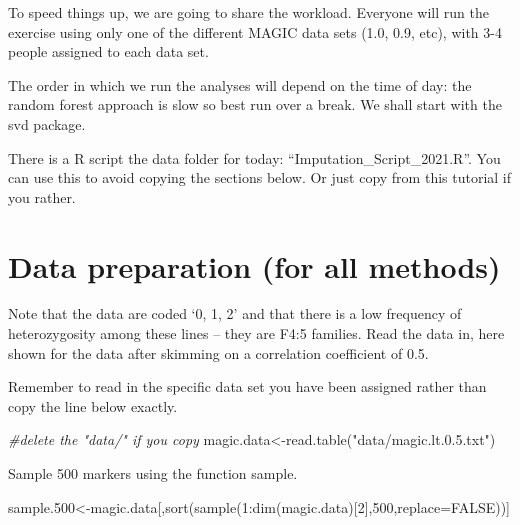 \documentclass[
]{book}
\makeatletter
\newenvironment{Shaded}{\begin{snugshade}}{\end{snugshade}}
\newcommand{\AttributeTok}[1]{\textcolor[rgb]{0.77,0.63,0.00}{#1}}
\newcommand{\CommentTok}[1]{\textcolor[rgb]{0.56,0.35,0.01}{\textit{#1}}}
\newcommand{\ConstantTok}[1]{\textcolor[rgb]{0.00,0.00,0.00}{#1}}
\newcommand{\DecValTok}[1]{\textcolor[rgb]{0.00,0.00,0.81}{#1}}
\newcommand{\FloatTok}[1]{\textcolor[rgb]{0.00,0.00,0.81}{#1}}
\newcommand{\FunctionTok}[1]{\textcolor[rgb]{0.00,0.00,0.00}{#1}}
\newcommand{\NormalTok}[1]{#1}
\newcommand{\OtherTok}[1]{\textcolor[rgb]{0.56,0.35,0.01}{#1}}
\newcommand{\SpecialCharTok}[1]{\textcolor[rgb]{0.00,0.00,0.00}{#1}}
\newcommand{\StringTok}[1]{\textcolor[rgb]{0.31,0.60,0.02}{#1}}
\newenvironment{kframe}{%
\medskip{}
\setlength{\fboxsep}{.8em}
 \def\at@end@of@kframe{}%
 \ifinner\ifhmode%
  \def\at@end@of@kframe{\end{minipage}}%
  \begin{minipage}{\columnwidth}%
 \fi\fi%
 \def\FrameCommand##1{\hskip\@totalleftmargin \hskip-\fboxsep
 \colorbox{shadecolor}{##1}\hskip-\fboxsep
     \hskip-\linewidth \hskip-\@totalleftmargin \hskip\columnwidth}%
 \MakeFramed {\advance\hsize-\width
   \@totalleftmargin\z@ \linewidth\hsize
   \@setminipage}}%
 {\par\unskip\endMakeFramed%
 \at@end@of@kframe}
\newenvironment{rmdblock}[1]
  {
  \begin{itemize}
  \renewcommand{\labelitemi}{
    \raisebox{-.7\height}[0pt][0pt]{
      {\setkeys{Gin}{width=3em,keepaspectratio}\texttt{[image: images/\#1]}}
    }
  }
  \setlength{\fboxsep}{1em}
  \begin{kframe}
  \item
  }
  {
  \end{kframe}
  \end{itemize}
  }
\newenvironment{rmdnote}
  {\begin{rmdblock}{note}}
  {\end{rmdblock}}
\newenvironment{rmdwarning}
  {\begin{rmdblock}{warning}}
  {\end{rmdblock}}
\makeatother
\begin{document}
To speed things up, we are going to share the workload. Everyone will run the exercise using only one of the different MAGIC data sets (1.0, 0.9, etc), with 3-4 people assigned to each data set.

The order in which we run the analyses will depend on the time of day: the random forest approach is slow so best run over a break. We shall start with the svd package.

\begin{rmdnote}
There is a R script the data folder for today: ``Imputation\_Script\_2021.R''. You can use this to avoid copying the sections below. Or just copy from this tutorial if you rather.
\end{rmdnote}

\hypertarget{data-preparation-for-all-methods}{%
\section{Data preparation (for all methods)}\label{data-preparation-for-all-methods}}

Note that the data are coded `0, 1, 2' and that there is a low frequency of heterozygosity among these lines -- they are F4:5 families. Read the data in, here shown for the data after skimming on a correlation coefficient of 0.5.

\begin{rmdwarning}
Remember to read in the specific data set you have been assigned rather than copy the line below exactly.
\end{rmdwarning}

\begin{Shaded}
\begin{Highlighting}[]
\CommentTok{\#delete the "data/" if you copy}
\NormalTok{magic.data}\OtherTok{\textless{}{-}}\FunctionTok{read.table}\NormalTok{(}\StringTok{"data/magic.lt.0.5.txt"}\NormalTok{)}
\end{Highlighting}
\end{Shaded}

Sample 500 markers using the function sample.

\begin{Shaded}
\begin{Highlighting}[]
\NormalTok{sample}\FloatTok{.500}\OtherTok{\textless{}{-}}\NormalTok{magic.data[,}\FunctionTok{sort}\NormalTok{(}\FunctionTok{sample}\NormalTok{(}\DecValTok{1}\SpecialCharTok{:}\FunctionTok{dim}\NormalTok{(magic.data)[}\DecValTok{2}\NormalTok{],}\DecValTok{500}\NormalTok{,}\AttributeTok{replace=}\ConstantTok{FALSE}\NormalTok{))]}
\end{Highlighting}
\end{Shaded}
\end{document}
